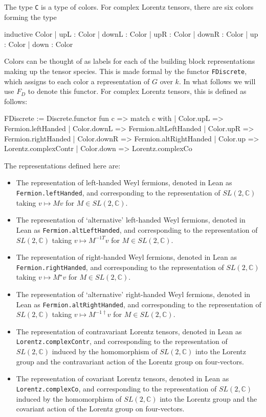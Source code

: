 \documentclass[a4paper, 11pt]{article}
\begin{document}
The type \lstinline|C| is a type of colors.
For complex Lorentz tensors, there are six colors forming the type 
\begin{code}
inductive Color
  | upL : Color
  | downL : Color
  | upR : Color
  | downR : Color
  | up : Color
  | down : Color
\end{code}
Colors can be thought of as labels for each of the building 
block representations making up the tensor species.  This is made formal by the functor 
\lstinline|FDiscrete|, which assigns to each color a representation of $G$ over $k$.
In what follows we will use $F_D$ to denote this functor.
For complex Lorentz tensors, this is defined as follows:
\begin{code}
FDiscrete := Discrete.functor fun c =>
  match c with
  | Color.upL => Fermion.leftHanded
  | Color.downL => Fermion.altLeftHanded
  | Color.upR => Fermion.rightHanded
  | Color.downR => Fermion.altRightHanded
  | Color.up => Lorentz.complexContr
  | Color.down => Lorentz.complexCo
\end{code}
The representations defined here are: 
\begin{itemize}
  \item The representation of left-handed Weyl fermions, 
    denoted in Lean as \lstinline|Fermion.leftHanded|, and corresponding to the 
    representation of $SL(2, \mathbb{C})$ taking $v \mapsto M v$ for $M \in SL(2, \mathbb{C})$.
  \item The representation of `alternative' left-handed Weyl fermions, 
    denoted in Lean as \lstinline|Fermion.altLeftHanded|, and corresponding to the 
    representation of $SL(2, \mathbb{C})$ taking $v \mapsto M^{-1 T} v$ for $M \in SL(2, \mathbb{C})$.
  \item The representation of right-handed Weyl fermions, 
    denoted in Lean as \lstinline|Fermion.rightHanded|, and corresponding to the 
    representation of $SL(2, \mathbb{C})$ taking $v \mapsto M^\star v$ for $M \in SL(2, \mathbb{C})$.
  \item The representation of `alternative' right-handed Weyl fermions,
    denoted in Lean as \lstinline|Fermion.altRightHanded|, and corresponding to the 
    representation of $SL(2, \mathbb{C})$ taking $v \mapsto M^{-1 \dagger} v$ for $M \in SL(2, \mathbb{C})$.
  \item The representation of contravariant Lorentz tensors, 
    denoted in Lean as \lstinline|Lorentz.complexContr|, and corresponding to the 
    representation of $SL(2, \mathbb{C})$ induced by the homomorphism of $SL(2, \mathbb{C})$ into 
    the Lorentz group and the contravariant action of the Lorentz group on four-vectors.
  \item The representation of covariant Lorentz tensors,
     denoted in Lean as \lstinline|Lorentz.complexCo|, and corresponding to the 
    representation of $SL(2, \mathbb{C})$ induced by the homomorphism of $SL(2, \mathbb{C})$ into 
    the Lorentz group and the covariant action of the Lorentz group on four-vectors.
\end{itemize}
\end{document}
